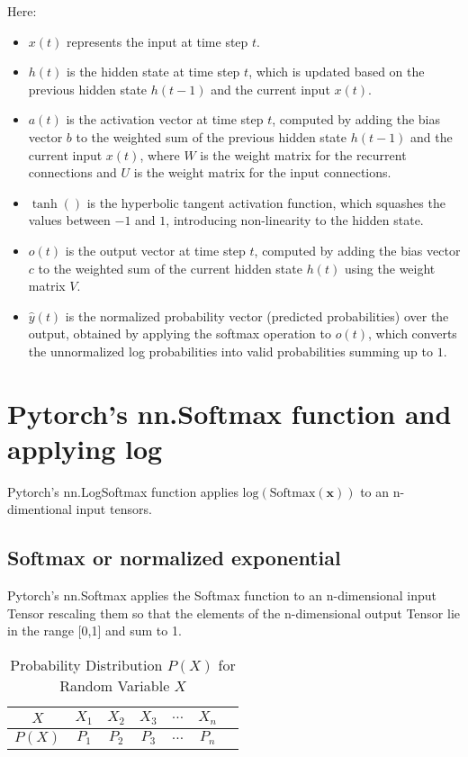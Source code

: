 Here:
\begin{itemize}
  \item $x(t)$ represents the input at time step $t$.
  \item $h(t)$ is the hidden state at time step $t$, which is updated based on the previous hidden state $h(t-1)$ and the current input $x(t)$.
  \item $a(t)$ is the activation vector at time step $t$, computed by adding the bias vector $b$ to the weighted sum of the previous hidden state $h(t-1)$ and the current input $x(t)$, where $W$ is the weight matrix for the recurrent connections and $U$ is the weight matrix for the input connections.
  \item $\tanh()$ is the hyperbolic tangent activation function, which squashes the values between $-1$ and $1$, introducing non-linearity to the hidden state.
  \item $o(t)$ is the output vector at time step $t$, computed by adding the bias vector $c$ to the weighted sum of the current hidden state $h(t)$ using the weight matrix $V$.
  \item $\hat{y}(t)$ is the normalized probability vector (predicted probabilities) over the output, obtained by applying the softmax operation to $o(t)$, which converts the unnormalized log probabilities into valid probabilities summing up to $1$.
\end{itemize}



\section{Pytorch's nn.Softmax function and applying log }

Pytorch's nn.LogSoftmax function applies $\text{log}\left(\text{Softmax}(\mathbf{x})\right)$ to an n-dimentional input tensors. \\



\subsection{Softmax or normalized exponential \parencite{Book-Bishop-Neural}} \label{sec:softmax}

Pytorch's nn.Softmax applies the Softmax function to an n-dimensional input Tensor rescaling them so that the elements of the n-dimensional output Tensor lie in the range [0,1] and sum to 1.

\begin{table}[h]
    \centering
    \begin{tabular}{ccccccc}
        \hline
        $X$ & $X_1$ & $X_2$ & $X_3$ & $\dots$ & $X_n$ \\
        \hline
        $P(X)$ & $P_1$ & $P_2$ & $P_3$ & $\dots$ & $P_n$ \\
        \hline
    \end{tabular}
    \caption{Probability Distribution $P(X)$ for Random Variable $X$}
    \label{tab:probability-distribution}
\end{table}

